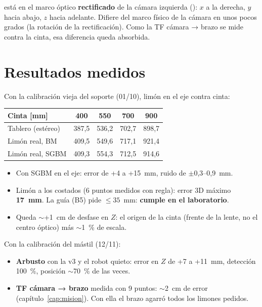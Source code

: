 \begin{nota}
 está en el marco óptico \textbf{rectificado} de la cámara izquierda (): $x$ a la
derecha, $y$ hacia abajo, $z$ hacia adelante. Difiere del marco físico de la cámara en unos pocos grados (la rotación
de la rectificación). Como la TF cámara → brazo se mide contra la cinta, esa diferencia queda absorbida.
\end{nota}

\section{Resultados medidos}

Con la calibración vieja del soporte (01/10), limón en el eje contra cinta:

\begin{center}
\begin{tabular}{@{}lcccc@{}}
\toprule
\textbf{Cinta [mm]} & 400 & 550 & 700 & 900 \\
\midrule
Tablero (estéreo) & 387,5 & 536,2 & 702,7 & 898,7 \\
Limón real, BM & 409,5 & 549,6 & 717,1 & 921,4 \\
Limón real, SGBM & 409,3 & 554,3 & 712,5 & 914,6 \\
\bottomrule
\end{tabular}
\end{center}

\begin{itemize}
  \item Con SGBM en el eje: error de +4 a +15~mm, ruido de $\pm$0,3--0,9~mm.
  \item Limón a los costados (6 puntos medidos con regla): error 3D máximo \textbf{17~mm}. La guía (B5) pide
        $\leq 35$~mm: \textbf{cumple en el laboratorio}.
  \item Queda $\sim$+1~cm de desfase en $Z$: el origen de la cinta (frente de la lente, no el centro óptico) más
        $\sim$1~\% de escala.
\end{itemize}

Con la calibración del mástil (12/11):
\begin{itemize}
  \item \textbf{Arbusto} con la v3 y el robot quieto: error en $Z$ de +7 a +11~mm, detección 100~\%, posición
        $\sim$70~\% de las veces.
  \item \textbf{TF cámara → brazo} medida con 9 puntos: $\sim$2~cm de error (capítulo~\ref{cap:mision}). Con ella el
        brazo agarró todos los limones pedidos.
\end{itemize}

